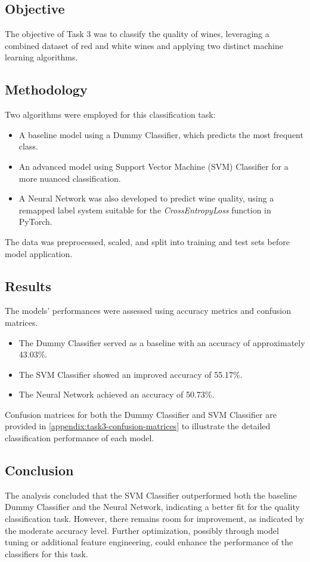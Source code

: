 \documentclass{article}
\begin{document}
    \subsection{Objective}
    The objective of Task 3 was to classify the quality of wines, leveraging a combined dataset of red and white wines and applying two distinct machine learning algorithms.

    \subsection{Methodology}
    Two algorithms were employed for this classification task:
    \begin{itemize}
        \item A baseline model using a Dummy Classifier, which predicts the most frequent class.
        \item An advanced model using Support Vector Machine (SVM) Classifier for a more nuanced classification.
        \item A Neural Network was also developed to predict wine quality, using a remapped label system suitable for the \textit{CrossEntropyLoss} function in PyTorch.
    \end{itemize}
    The data was preprocessed, scaled, and split into training and test sets before model application.

    \subsection{Results}
    The models' performances were assessed using accuracy metrics and confusion matrices.
    \begin{itemize}
        \item The Dummy Classifier served as a baseline with an accuracy of approximately 43.03\%.
        \item The SVM Classifier showed an improved accuracy of 55.17\%.
        \item The Neural Network achieved an accuracy of 50.73\%.
    \end{itemize}
    Confusion matrices for both the Dummy Classifier and SVM Classifier are provided in \ref{appendix:task3-confusion-matrices} to illustrate the detailed classification performance of each model.

    \subsection{Conclusion}
    The analysis concluded that the SVM Classifier outperformed both the baseline Dummy Classifier and the Neural Network, indicating a better fit for the quality classification task. However, there remains room for improvement, as indicated by the moderate accuracy level. Further optimization, possibly through model tuning or additional feature engineering, could enhance the performance of the classifiers for this task.
\end{document}
